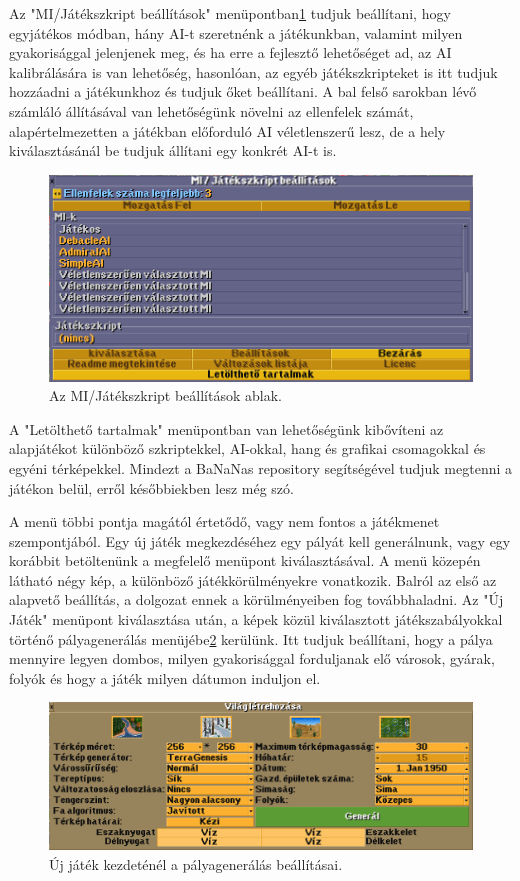 Az "MI/Játékszkript beállítások" menüpontban\ref{fig:mibeall} tudjuk beállítani, hogy egyjátékos módban, hány AI-t szeretnénk a játékunkban, valamint milyen gyakorisággal jelenjenek meg, és ha erre a fejlesztő lehetőséget ad, az AI kalibrálására is van lehetőség, hasonlóan, az egyéb játékszkripteket is itt tudjuk hozzáadni a játékunkhoz és tudjuk őket beállítani. A bal felső sarokban lévő számláló állításával van lehetőségünk növelni az ellenfelek számát, alapértelmezetten a játékban előforduló AI véletlenszerű lesz, de a hely kiválasztásánál be tudjuk állítani egy konkrét AI-t is.

\begin{figure}
	\centering
	\includegraphics[scale=0.6]{images/mibeall.png}
	\caption{Az MI/Játékszkript beállítások ablak.}
	\label{fig:mibeall}
\end{figure}

A "Letölthető tartalmak" menüpontban van lehetőségünk kibővíteni az alapjátékot különböző szkriptekkel, AI-okkal, hang és grafikai csomagokkal és egyéni térképekkel. Mindezt a BaNaNas repository segítségével tudjuk megtenni a játékon belül, erről későbbiekben lesz még szó. 

A menü többi pontja magától értetődő, vagy nem fontos a játékmenet szempontjából. Egy új játék megkezdéséhez egy pályát kell generálnunk, vagy egy korábbit betöltenünk a megfelelő menüpont kiválasztásával. A menü közepén látható négy kép, a különböző játékkörülményekre vonatkozik. Balról az első az alapvető beállítás, a dolgozat ennek a körülményeiben fog továbbhaladni. Az "Új Játék" menüpont kiválasztása után, a képek közül kiválasztott játékszabályokkal történő pályagenerálás menüjébe\ref{fig:generalas} kerülünk. Itt tudjuk beállítani, hogy a pálya mennyire legyen dombos, milyen gyakorisággal forduljanak elő városok, gyárak, folyók és hogy a játék milyen dátumon induljon el.

\begin{figure}
	\centering
	\includegraphics[scale=0.5]{images/generalas.png}
	\caption{Új játék kezdeténél a pályagenerálás beállításai.}
	\label{fig:generalas}
\end{figure}

